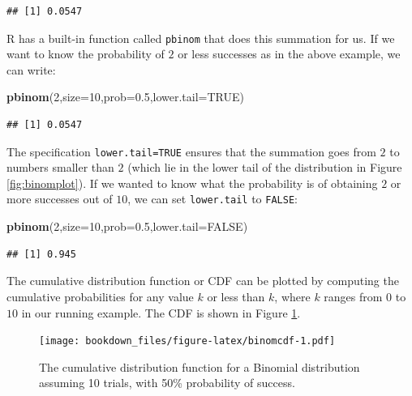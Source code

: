 \documentclass[12pt,]{krantz}
\newenvironment{Shaded}{\begin{snugshade}}{\end{snugshade}}
\newcommand{\KeywordTok}[1]{\textcolor[rgb]{0.13,0.29,0.53}{\textbf{#1}}}
\newcommand{\DataTypeTok}[1]{\textcolor[rgb]{0.13,0.29,0.53}{#1}}
\newcommand{\DecValTok}[1]{\textcolor[rgb]{0.00,0.00,0.81}{#1}}
\newcommand{\FloatTok}[1]{\textcolor[rgb]{0.00,0.00,0.81}{#1}}
\newcommand{\OtherTok}[1]{\textcolor[rgb]{0.56,0.35,0.01}{#1}}
\newcommand{\NormalTok}[1]{#1}
\theoremstyle{definition}
\theoremstyle{definition}
\theoremstyle{definition}
\theoremstyle{remark}
\begin{document}
\begin{verbatim}
## [1] 0.0547
\end{verbatim}

R has a built-in function called \texttt{pbinom} that does this
summation for us. If we want to know the probability of \(2\) or less
successes as in the above example, we can write:

\begin{Shaded}
\begin{Highlighting}[]
\KeywordTok{pbinom}\NormalTok{(}\DecValTok{2}\NormalTok{,}\DataTypeTok{size=}\DecValTok{10}\NormalTok{,}\DataTypeTok{prob=}\FloatTok{0.5}\NormalTok{,}\DataTypeTok{lower.tail=}\OtherTok{TRUE}\NormalTok{)}
\end{Highlighting}
\end{Shaded}

\begin{verbatim}
## [1] 0.0547
\end{verbatim}

The specification \texttt{lower.tail=TRUE} ensures that the summation
goes from \(2\) to numbers smaller than \(2\) (which lie in the lower
tail of the distribution in Figure \ref{fig:binomplot}). If we wanted to
know what the probability is of obtaining \(2\) or more successes out of
\(10\), we can set \texttt{lower.tail} to \texttt{FALSE}:

\begin{Shaded}
\begin{Highlighting}[]
\KeywordTok{pbinom}\NormalTok{(}\DecValTok{2}\NormalTok{,}\DataTypeTok{size=}\DecValTok{10}\NormalTok{,}\DataTypeTok{prob=}\FloatTok{0.5}\NormalTok{,}\DataTypeTok{lower.tail=}\OtherTok{FALSE}\NormalTok{)}
\end{Highlighting}
\end{Shaded}

\begin{verbatim}
## [1] 0.945
\end{verbatim}

The cumulative distribution function or CDF can be plotted by computing
the cumulative probabilities for any value \(k\) or less than \(k\),
where \(k\) ranges from \(0\) to \(10\) in our running example. The CDF
is shown in Figure \ref{fig:binomcdf}.

\begin{figure}
\centering
\texttt{[image: bookdown\_files/figure-latex/binomcdf-1.pdf]}
\caption{\label{fig:binomcdf}The cumulative distribution function for a
Binomial distribution assuming 10 trials, with 50\% probability of
success.}
\end{figure}
\end{document}
